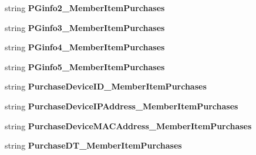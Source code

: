 \begin{DoxyCompactItemize}
\item 
string {\bfseries P\+Ginfo2\+\_\+\+Member\+Item\+Purchases}\hypertarget{a00118_acaf082a509ac7bf52994eac7fb3e4abc}{}\label{a00118_acaf082a509ac7bf52994eac7fb3e4abc}

\item 
string {\bfseries P\+Ginfo3\+\_\+\+Member\+Item\+Purchases}\hypertarget{a00118_a4eba0c4a8b3965bab0e423e38a40b2bd}{}\label{a00118_a4eba0c4a8b3965bab0e423e38a40b2bd}

\item 
string {\bfseries P\+Ginfo4\+\_\+\+Member\+Item\+Purchases}\hypertarget{a00118_a17f316dd229ce443f2b8deeb4c6298b5}{}\label{a00118_a17f316dd229ce443f2b8deeb4c6298b5}

\item 
string {\bfseries P\+Ginfo5\+\_\+\+Member\+Item\+Purchases}\hypertarget{a00118_aaabb5015fd00e1fbe0c9dbbc78dabdae}{}\label{a00118_aaabb5015fd00e1fbe0c9dbbc78dabdae}

\item 
string {\bfseries Purchase\+Device\+I\+D\+\_\+\+Member\+Item\+Purchases}\hypertarget{a00118_a2c3099d55b4293dfb320009c97743d33}{}\label{a00118_a2c3099d55b4293dfb320009c97743d33}

\item 
string {\bfseries Purchase\+Device\+I\+P\+Address\+\_\+\+Member\+Item\+Purchases}\hypertarget{a00118_a035f9d97d5d1a970495877349cc2d676}{}\label{a00118_a035f9d97d5d1a970495877349cc2d676}

\item 
string {\bfseries Purchase\+Device\+M\+A\+C\+Address\+\_\+\+Member\+Item\+Purchases}\hypertarget{a00118_a3fd47d3625a537f44162d9cb84956cf8}{}\label{a00118_a3fd47d3625a537f44162d9cb84956cf8}

\item 
string {\bfseries Purchase\+D\+T\+\_\+\+Member\+Item\+Purchases}\hypertarget{a00118_a188bfd29afa36b71dcc1536e9599e98e}{}\label{a00118_a188bfd29afa36b71dcc1536e9599e98e}


\end{DoxyCompactItemize}

